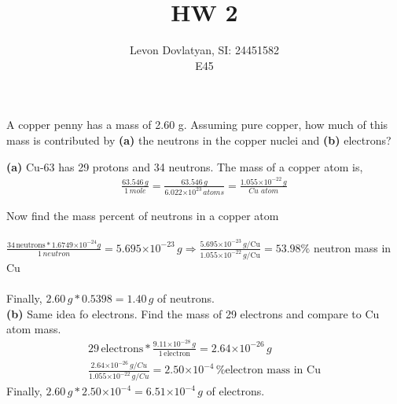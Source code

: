 \documentclass[12pt]{article}
\newenvironment{problem}[2][Problem]{\begin{trivlist}
\item[\hskip \labelsep {\bfseries #1}\hskip \labelsep {\bfseries #2.}]}{\end{trivlist}}
\begin{document}
\providecommand{\e}[1]{\ensuremath{\times 10^{#1}}}
 
\title{HW 2}%
\author{Levon Dovlatyan, SI: 24451582\\ %
E45} %
 
\maketitle
 
\begin{problem}{2.9} %
A copper penny has a mass of 2.60 g. Assuming pure copper, how much of this mass is contributed by \textbf{(a)} the neutrons in the copper nuclei and \textbf{(b)} electrons?
\end{problem}
 
\textbf{(a)} Cu-63 has 29 protons and 34 neutrons. The mass of a copper atom is,
\begin{align*}
\frac{63.546 \, g}{1 \, mole} = \frac{63.546 \,g}{6.022 \e{23} \, atoms} = \frac{1.055 \e{-22} \,g}{Cu \,\,atom}
\end{align*}

Now find the mass percent of neutrons in a copper atom \\ \\
$\frac{34 \,\text{neutrons} * 1.6749 \e{-24} g}{1 \, neutron} = 5.695 \e{-23} \, g \Rightarrow \frac{5.695 \e{-23} \, g/\text{Cu}}{1.055 \e{-22} \, g/\text{Cu} } = 53.98\%$ neutron mass in Cu \\ \\
Finally, $2.60 \, g * 0.5398 = 1.40 \, g$ of neutrons. \\

\textbf{(b)} Same idea fo electrons. Find the mass of 29 electrons and compare to Cu atom mass.
\begin{align*}
29 \,\text{electrons} * \frac{9.11 \e{-28} \, g}{1 \,\text{electron}} = 2.64 \e{-26} \, g \\
\frac{2.64 \e{-26} \,g/Cu}{1.055 \e{-22} \, g/Cu} = 2.50 \e{-4} \, \% \text{electron mass in Cu}
\end{align*}
Finally, $2.60 \, g * 2.50 \e{-4}= 6.51 \e{-4} \, g$ of electrons. \\
\end{document}

